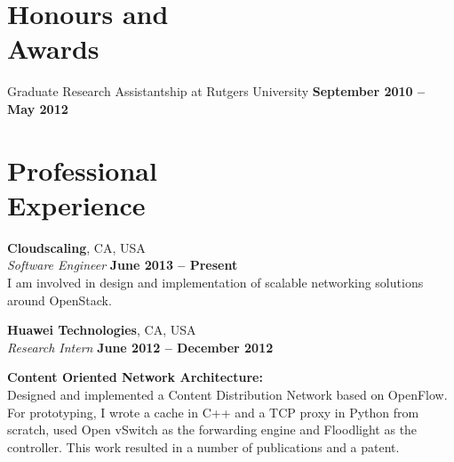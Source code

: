 \documentclass[margin,line]{resume}
\begin{document}
\begin{resume}
  \section{\mysidestyle Honours and\\Awards} 

    Graduate Research Assistantship at Rutgers University \hfill \textbf{September 2010 -- May 2012}
    \section{\mysidestyle Professional\\Experience}

\textbf{Cloudscaling}, CA, USA\\
\textsl{Software Engineer} \hfill \textbf{June 2013 -- Present}\\%
I am involved in design and implementation of scalable networking solutions around OpenStack.

\textbf{Huawei Technologies}, CA, USA\\
\textsl{Research Intern} \hfill \textbf{June 2012 -- December 2012}\\\vspace{-3mm}
\begin{list2}
\item \textbf{Content Oriented Network Architecture:}\\
Designed and implemented a Content Distribution Network based on OpenFlow. For prototyping, I wrote a cache in C++ and a TCP proxy in Python from scratch, used Open vSwitch as the forwarding engine and Floodlight as the controller. This work resulted in a number of publications and a patent.
\end{list2}


\end{resume}
\end{document}
